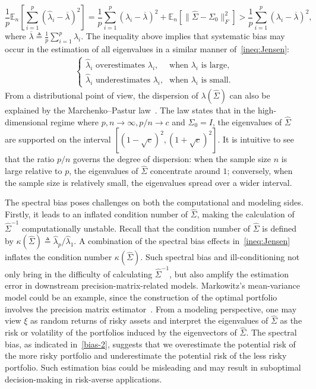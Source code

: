 \documentclass[11pt]{article}
\newcommand{\Let}{\triangleq}
\def\E {\mathbb{E}}
\newcommand{\wh}{\widehat}
\begin{document}
\[
    \frac{1}{p}\E_n\left[\sum_{i=1}^p (\wh\lambda_i-\overline{\lambda})^2\right] = \frac{1}{p}\sum_{i=1}^p (\lambda_i-\overline{\lambda})^2 + \E_n[\|\wh\Sigma-\Sigma_0\|_F^2] > \frac{1}{p}\sum_{i=1}^p (\lambda_i-\overline{\lambda})^2,
\]
where $\overline{\lambda}\Let \frac{1}{p}\sum_{i=1}^p \lambda_i$.
The inequality above implies that systematic bias may occur in the estimation of all eigenvalues in a similar manner of~\eqref{ineq:Jensen}: 
\begin{align}\label{bias-2}
    \begin{cases}
    \text{$\wh\lambda_i$ overestimates $\lambda_i$,} & \text{when $\lambda_i$ is large,} \\
    \text{$\wh\lambda_i$ underestimates $\lambda_i$,} & \text{when $\lambda_i$ is small.}
    \end{cases}
\end{align}
From a distributional point of view, the dispersion of $\lambda(\wh\Sigma)$ can also be explained by the Marchenko–Pastur law~\citep{ref:marvcenko1967distribution}. The law states that in the high-dimensional regime where $p,n\to \infty, p/n \to c$ and $\Sigma_0 = I$, the eigenvalues of $\wh\Sigma$ are supported on the interval $[(1-\sqrt{c})^2, (1+\sqrt{c})^2]$. It is intuitive to see that the ratio $p/n$ governs the degree of dispersion: when the sample size $n$ is large relative to $p$, the eigenvalues of $\wh\Sigma$ concentrate around $1$; conversely, when the sample size is relatively small, the eigenvalues spread over a wider interval.


The spectral bias poses challenges on both the computational and modeling sides. Firstly, it leads to an inflated condition number of $\wh\Sigma$, making the calculation of $\wh{\Sigma}^{-1}$ computationally unstable. Recall that the condition number of $\wh\Sigma$ is defined by $\kappa(\wh\Sigma)\Let \wh\lambda_p/\wh\lambda_1$. 
A combination of the spectral bias effects in~\eqref{ineq:Jensen} inflates the condition number $\kappa(\wh\Sigma)$. Such spectral bias and ill-conditioning not only bring in the difficulty of calculating $\wh\Sigma^{-1}$, but also amplify the estimation error in downstream precision-matrix-related models.
Markowitz's mean-variance model could be an example, since the construction of the optimal portfolio involves the precision matrix estimator~\citep{ref:LEDOIT2003603,ref:michaud1989markowitz}.
From a modeling perspective, one may view $\xi$ as random returns of risky assets and interpret the eigenvalues of $\wh\Sigma$ as the risk or volatility of the portfolios induced by the eigenvectors of $\wh\Sigma$. The spectral bias, as indicated in~\eqref {bias-2}, suggests that we overestimate the potential risk of the more risky portfolio and underestimate the potential risk of the less risky portfolio. Such estimation bias could be misleading and may result in suboptimal decision-making in risk-averse applications. 
\end{document}
